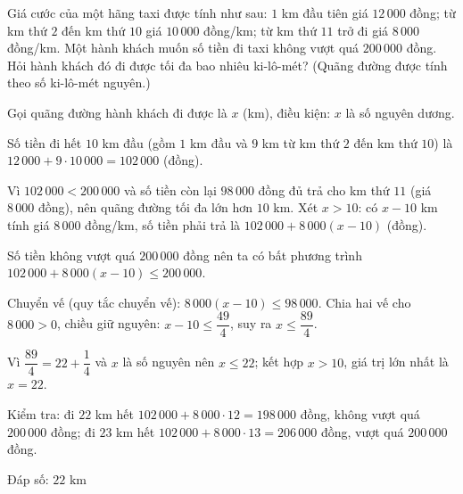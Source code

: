 \begin{problem}[9DS-BPT-007]
Giá cước của một hãng taxi được tính như sau: $1$ km đầu tiên giá $12\,000$ đồng; từ km thứ $2$ đến km thứ $10$ giá $10\,000$ đồng/km; từ km thứ $11$ trở đi giá $8\,000$ đồng/km. Một hành khách muốn số tiền đi taxi không vượt quá $200\,000$ đồng. Hỏi hành khách đó đi được tối đa bao nhiêu ki-lô-mét? (Quãng đường được tính theo số ki-lô-mét nguyên.)

\begin{solution}
Gọi quãng đường hành khách đi được là $x$ (km), điều kiện: $x$ là số nguyên dương.

Số tiền đi hết $10$ km đầu (gồm $1$ km đầu và $9$ km từ km thứ $2$ đến km thứ $10$) là $12\,000 + 9 \cdot 10\,000 = 102\,000$ (đồng).

Vì $102\,000 < 200\,000$ và số tiền còn lại $98\,000$ đồng đủ trả cho km thứ $11$ (giá $8\,000$ đồng), nên quãng đường tối đa lớn hơn $10$ km. Xét $x > 10$: có $x - 10$ km tính giá $8\,000$ đồng/km, số tiền phải trả là $102\,000 + 8\,000(x - 10)$ (đồng).

Số tiền không vượt quá $200\,000$ đồng nên ta có bất phương trình $102\,000 + 8\,000(x - 10) \leq 200\,000$.

Chuyển vế (quy tắc chuyển vế): $8\,000(x - 10) \leq 98\,000$. Chia hai vế cho $8\,000 > 0$, chiều giữ nguyên: $x - 10 \leq \dfrac{49}{4}$, suy ra $x \leq \dfrac{89}{4}$.

Vì $\dfrac{89}{4} = 22 + \dfrac{1}{4}$ và $x$ là số nguyên nên $x \leq 22$; kết hợp $x > 10$, giá trị lớn nhất là $x = 22$.

Kiểm tra: đi $22$ km hết $102\,000 + 8\,000 \cdot 12 = 198\,000$ đồng, không vượt quá $200\,000$ đồng; đi $23$ km hết $102\,000 + 8\,000 \cdot 13 = 206\,000$ đồng, vượt quá $200\,000$ đồng.

Đáp số: $\boxed{22 \text{ km}}$
\end{solution}
\end{problem}

